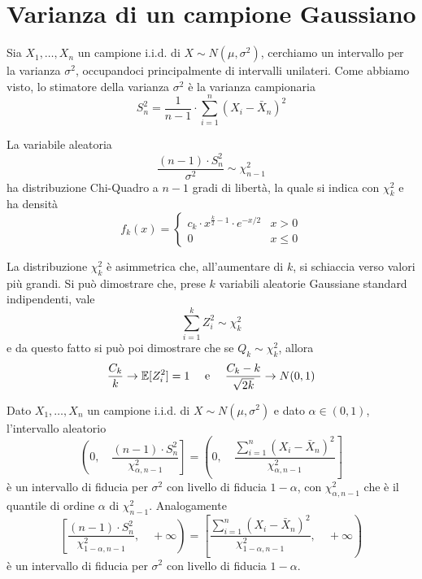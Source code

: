 \section{Varianza di un campione Gaussiano}
Sia $X_1, \dots, X_n$ un campione i.i.d. di $X \sim N(\mu, \sigma^2)$, cerchiamo un intervallo
per la varianza $\sigma^2$, occupandoci principalmente di intervalli unilateri. Come abbiamo visto,
lo stimatore della varianza $\sigma^2$ è la varianza campionaria
\[ S_n^2 = \frac{1}{n-1} \cdot \sum_{i=1}^n (X_i - \bar{X}_n)^2 \]

\begin{proposition}
	La variabile aleatoria
	\[ \frac{(n-1) \cdot S_n^2}{\sigma^2} \sim \chi_{n-1}^2 \]
	ha distribuzione Chi-Quadro a $n-1$ gradi di libertà, la quale si indica con $\chi_k^2$ e
	ha densità
	\[
		f_k(x) = \begin{cases}
			c_k \cdot x^{\frac{k}{2} - 1} \cdot e^{-x/2} & x > 0    \\
			0                                            & x \leq 0
		\end{cases}
	\]
\end{proposition}

La distribuzione $\chi_k^2$ è asimmetrica che, all'aumentare di $k$, si schiaccia verso valori più
grandi. Si può dimostrare che, prese $k$ variabili aleatorie Gaussiane standard indipendenti, vale
\[ \sum_{i=1}^k Z_i^2 \sim \chi_k^2 \]
e da questo fatto si può poi dimostrare che se $Q_k \sim \chi_k^2$, allora
\[ \frac{C_k}{k} \to \mathbb{E}[Z_i^2] = 1 \quad \text{ e } \quad \frac{C_k - k}{\sqrt{2k}} \to N(0, 1) \]

\begin{proposition}
	Dato $X_1, \dots, X_n$ un campione i.i.d. di $X \sim N(\mu, \sigma^2)$ e dato $\alpha \in (0,1)$,
	l'intervallo aleatorio
	\begin{equation*}
		\left( \left. 0, \quad
		\frac{(n-1) \cdot S_n^2}{\chi_{\alpha, n-1}^2} \right] \right. =
		\left( \left. 0, \quad
		\frac{\sum_{i=1}^n (X_i - \bar{X}_n)^2}{\chi_{\alpha, n-1}^2} \right] \right.
	\end{equation*}
	è un intervallo di fiducia per $\sigma^2$ con livello di fiducia $1-\alpha$, con
	$\chi_{\alpha, n-1}^2$ che è il quantile di ordine $\alpha$ di $\chi_{n-1}^2$. Analogamente
	\begin{equation*}
		\left[ \left. \frac{(n-1) \cdot S_n^2}{\chi_{1-\alpha, n-1}^2},
		\quad +\infty \right) \right. =
		\left[ \left. \frac{\sum_{i=1}^n (X_i - \bar{X}_n)^2}{\chi_{1-\alpha, n-1}^2},
		\quad +\infty \right) \right.
	\end{equation*}
	è un intervallo di fiducia per $\sigma^2$ con livello di fiducia $1-\alpha$.
\end{proposition}
